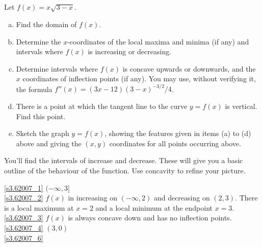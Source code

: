 %
%

\subsection*{\Procedural}

\begin{Mquestion}[2007H]
 Let $f(x) = x\sqrt{3 - x}$.
\begin{enumerate}[(a)]
\item\label{s3.62007_1} Find the domain of $f(x)$.
\item\label{s3.62007_2} Determine the $x$-coordinates of the local
maxima and minima (if any) and intervals where $f(x)$ is increasing or decreasing.
\item\label{s3.62007_3}  Determine intervals where $f(x)$ is concave
upwards or downwards, and the $x$ coordinates of inflection points (if any).
You may use, without verifying it, the formula $f''(x) = (3x -12)(3 - x)^{-3/2}/4$.
\item\label{s3.62007_4}  There is a point at which the tangent line to the
curve $y = f(x)$ is vertical. Find this point.
\item\label{s3.62007_6} Sketch the graph $y = f(x)$, showing
the features given in items (a) to (d) above and giving the $(x, y)$ coordinates
for all points occurring above.
\end{enumerate}
\end{Mquestion}
\begin{hint}
You'll find the intervals of increase and decrease. These will give you a basic outline of the behaviour of the function. Use  concavity to refine your picture.
\end{hint}
\begin{answer}
\eqref{s3.62007_1} $(-\infty,3]$
\\
\eqref{s3.62007_2} $f(x)$ in increasing on $(-\infty,2)$ and decreasing on $(2,3)$. There is a local maximum at $x=2$ and a local minimum at the endpoint $x=3$.
\\
\eqref{s3.62007_3} $f(x)$ is always concave down and has no inflection points.
\\
\eqref{s3.62007_4} $(3,0)$
\\
\eqref{s3.62007_6}
\begin{center}
\end{center}

\end{answer}
